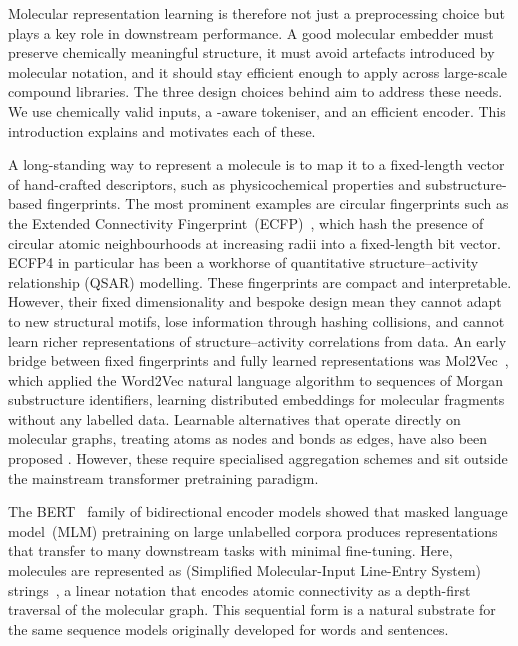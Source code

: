 \documentclass[11pt,a4paper]{article}
\begin{document}
Molecular representation learning is therefore not just a preprocessing choice but plays a key role in downstream performance. A good molecular embedder must preserve chemically meaningful structure, it must avoid artefacts introduced by molecular notation, and it should stay efficient enough to apply across large-scale compound libraries. The three design choices behind \model{} aim to address these needs. We use chemically valid \selfies{} inputs, a \selfies{}-aware tokeniser, and an efficient \modernbert{} encoder. This introduction explains and motivates each of these.

A long-standing way to represent a molecule is to map it to a
fixed-length vector of hand-crafted descriptors, such as physicochemical
properties and substructure-based fingerprints. The most prominent examples are circular
fingerprints such as the Extended Connectivity
Fingerprint~(ECFP)~\citep{rogersExtendedConnectivityFingerprints2010}, which
hash the presence of circular atomic neighbourhoods at increasing radii into a
fixed-length bit vector. ECFP4 in particular has been a workhorse of quantitative
structure--activity relationship (QSAR) modelling.
These fingerprints are compact and interpretable. However, their fixed dimensionality and bespoke
design mean they cannot adapt to new structural motifs, lose information through
hashing collisions, and cannot learn richer representations of structure--activity correlations from data.
An early bridge between fixed fingerprints and fully learned representations
was Mol2Vec~\citep{jaegerMol2vecUnsupervisedMachine2017}, which applied
the Word2Vec natural language algorithm to sequences of Morgan substructure identifiers,
learning distributed embeddings for molecular fragments without any labelled
data.
Learnable alternatives that operate directly on molecular graphs, treating
atoms as nodes and bonds as edges, have also been proposed
\citep{gilmerNeuralMessagePassing2017,rongGroverTransformerSelfsupervised2020}. However, these require specialised aggregation schemes and sit outside the mainstream transformer pretraining paradigm.

The BERT~\citep{devlinBERTPreTrainingDeep2019} family of bidirectional
encoder models showed that masked language model~(MLM) pretraining on
large unlabelled corpora produces representations that transfer to many
downstream tasks with minimal fine-tuning.
Here, molecules are represented as \smiles{} (Simplified Molecular-Input Line-Entry
System) strings~\citep{weininger1988smiles}, a linear notation that encodes
atomic connectivity as a depth-first traversal of the molecular graph. This
sequential form is a natural substrate for the same sequence models originally
developed for words and sentences.
\end{document}
